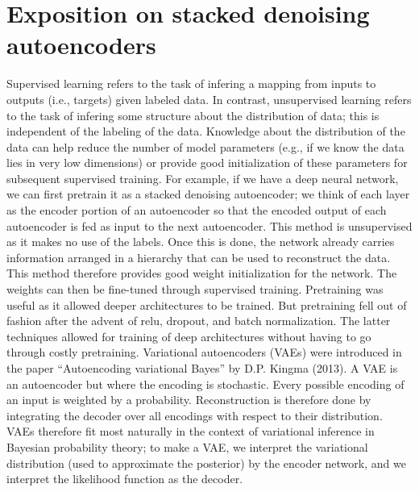 \documentclass[11pt]{article}
\begin{document}
\section{Exposition on stacked denoising autoencoders}

Supervised learning refers to the task of infering a mapping from inputs to outputs (i.e., targets) given labeled data. In contrast, unsupervised learning refers to the task of infering some structure about the distribution of data; this is independent of the labeling of the data. Knowledge about the distribution of the data can help reduce the number of model parameters (e.g., if we know the data lies in very low dimensions) or provide good initialization of these parameters for subsequent supervised training. For example, if we have a deep neural network, we can first pretrain it as a stacked denoising autoencoder; we think of each layer as the encoder portion of an autoencoder so that the encoded output of each autoencoder is fed as input to the next autoencoder. This method is unsupervised as it makes no use of the labels. Once this is done, the network already carries information arranged in a hierarchy that can be used to reconstruct the data. This method therefore provides good weight initialization for the network. The weights can then be fine-tuned through supervised training. Pretraining was useful as it allowed deeper architectures to be trained. But pretraining fell out of fashion after the advent of relu, dropout, and batch normalization. The latter techniques allowed for training of deep architectures without having to go through costly pretraining. Variational autoencoders (VAEs) were introduced in the paper ``Autoencoding variational Bayes'' by D.P. Kingma (2013). A VAE is an autoencoder but where the encoding is stochastic. Every possible encoding of an input is weighted by a probability. Reconstruction is therefore done by integrating the decoder over all encodings with respect to their distribution. VAEs therefore fit most naturally in the context of variational inference in Bayesian probability theory; to make a VAE, we interpret the variational distribution (used to approximate the posterior) by the encoder network, and we interpret the likelihood function as the decoder.
\end{document}
